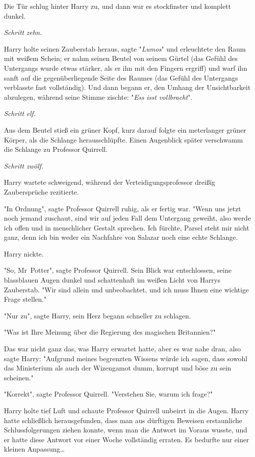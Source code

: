 {Die Tür schlug hinter Harry zu, und dann war es stockfinster und komplett dunkel.

\emph{Schritt zehn.}

Harry holte seinen Zauberstab heraus, sagte "\emph{Lumos}" und erleuchtete den Raum mit weißem Schein; er nahm seinen Beutel von seinem Gürtel (das Gefühl des Untergangs wurde etwas stärker, als er ihn mit den Fingern ergriff) und warf ihn sanft auf die gegenüberliegende Seite des Raumes (das Gefühl des Untergangs verblasste fast vollständig). Und dann begann er, den Umhang der Unsichtbarkeit abzulegen, während seine Stimme zischte: "\emph{Ess isst vollbracht}".

\emph{Schritt elf.}

Aus dem Beutel stieß ein grüner Kopf, kurz darauf folgte ein meterlanger grüner Körper, als die Schlange herausschlüpfte. Einen Augenblick später verschwamm die Schlange zu Professor Quirrell.

\emph{Schritt zwölf.}

Harry wartete schweigend, während der Verteidigungsprofessor dreißig Zaubersprüche rezitierte.

"In Ordnung", sagte Professor Quirrell ruhig, als er fertig war. "Wenn uns jetzt noch jemand zuschaut, sind wir auf jeden Fall dem Untergang geweiht, also werde ich offen und in menschlicher Gestalt sprechen. Ich fürchte, Parsel steht mir nicht ganz, denn ich bin weder ein Nachfahre von Salazar noch eine echte Schlange.

Harry nickte.

"So, Mr~Potter", sagte Professor Quirrell. Sein Blick war entschlossen, seine blassblauen Augen dunkel und schattenhaft im weißen Licht von Harrys Zauberstab. "Wir sind allein und unbeobachtet, und ich muss Ihnen eine wichtige Frage stellen."

"Nur zu", sagte Harry, sein Herz begann schneller zu schlagen.

"Was ist Ihre Meinung über die Regierung des magischen Britannien?"

Das war nicht ganz das, was Harry erwartet hatte, aber es war nahe dran, also sagte Harry: "Aufgrund meines begrenzten Wissens würde ich sagen, dass sowohl das Ministerium als auch der Wizengamot dumm, korrupt und böse zu sein scheinen."

"Korrekt", sagte Professor Quirrell. "Verstehen Sie, warum ich frage?"

Harry holte tief Luft und schaute Professor Quirrell unbeirrt in die Augen. Harry hatte schließlich herausgefunden, dass man aus dürftigen Beweisen erstaunliche Schlussfolgerungen ziehen konnte, wenn man die Antwort im Voraus wusste, und er hatte diese Antwort vor einer Woche vollständig erraten. Es bedurfte nur einer kleinen Anpassung…

}
